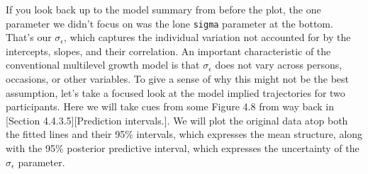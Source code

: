\documentclass[]{article}
\begin{document}
If you look back up to the model summary from before the plot, the one
parameter we didn't focus on was the lone \texttt{sigma} parameter at
the bottom. That's our \(\sigma_\epsilon\), which captures the
individual variation not accounted for by the intercepts, slopes, and
their correlation. An important characteristic of the conventional
multilevel growth model is that \(\sigma_\epsilon\) does not vary across
persons, occasions, or other variables. To give a sense of why this
might not be the best assumption, let's take a focused look at the model
implied trajectories for two participants. Here we will take cues from
some Figure 4.8 from way back in {[}Section 4.4.3.5{]}{[}Prediction
intervals.{]}. We will plot the original data atop both the fitted lines
and their 95\% intervals, which expresses the mean structure, along with
the 95\% posterior predictive interval, which expresses the uncertainty
of the \(\sigma_\epsilon\) parameter.
\end{document}
